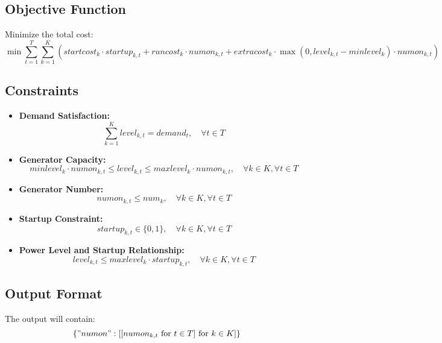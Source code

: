 \documentclass{article}
\begin{document}
\subsection*{Objective Function}
Minimize the total cost:
\[
\min \sum_{t=1}^{T} \sum_{k=1}^{K} \left( startcost_{k} \cdot startup_{k, t} + runcost_{k} \cdot numon_{k, t} + extracost_{k} \cdot \max(0, level_{k, t} - minlevel_{k}) \cdot numon_{k, t} \right)
\]

\subsection*{Constraints}
\begin{itemize}
    \item \textbf{Demand Satisfaction:} 
    \[
    \sum_{k=1}^{K} level_{k, t} = demand_{t}, \quad \forall t \in T
    \]
    
    \item \textbf{Generator Capacity:}
    \[
    minlevel_{k} \cdot numon_{k, t} \leq level_{k, t} \leq maxlevel_{k} \cdot numon_{k, t}, \quad \forall k \in K, \forall t \in T
    \]

    \item \textbf{Generator Number:}
    \[
    numon_{k, t} \leq num_{k}, \quad \forall k \in K, \forall t \in T
    \]

    \item \textbf{Startup Constraint:}
    \[
    startup_{k, t} \in \{0, 1\}, \quad \forall k \in K, \forall t \in T
    \]

    \item \textbf{Power Level and Startup Relationship:}
    \[
    level_{k, t} \leq maxlevel_{k} \cdot startup_{k, t}, \quad \forall k \in K, \forall t \in T
    \]
\end{itemize}

\subsection*{Output Format}
The output will contain:
\[
\{ "numon": [[numon_{k, t} \text{ for } t \in T] \text{ for } k \in K] \} 
\]
\end{document}
